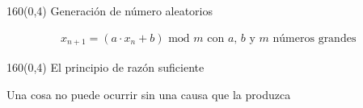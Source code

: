 \documentclass[shownotes,aspectratio=169]{beamer}
\begin{document}
\begin{frame}[plain]
 \begin{textblock}{160}(0,4)
 \centering \LARGE
 Generación de número aleatorios
\end{textblock}
\vspace{0.75cm}

\begin{align*}
 x_{n+1} = ( a \cdot x_n + b )\text{ mod } m \text{ \ \ \ \ \ \  con $a$, $b$ y $m$ números grandes }
 \end{align*}

\vspace{0.5cm}

\pause

\centering

 
\end{frame}

\begin{frame}[plain]
 \begin{textblock}{160}(0,4)
 \centering \LARGE
El principio de razón suficiente
\end{textblock}
\vspace{0.75cm}

\begin{center} \Large
Una cosa no puede ocurrir sin una causa que la produzca 
\end{center} 
 
\end{frame}
\end{document}
